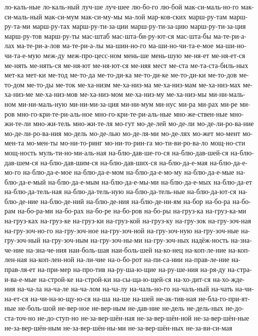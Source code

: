 {ло-каль-ные
ло-каль-ный
луч-ше
луч-шее
лю-бо-го
лю-бой
мак-си-маль-но-го
мак-си-маль-ный
мак-си-мум
мак-си-му-мы
ма-лой
мар-ков-ских
марш-ру-там
марш-ру-та-ми
марш-ру-тах
марш-ру-ти-за-ции
марш-ру-ти-за-цию
марш-ру-ти-за-ция
марш-ру-тов
марш-ру-ты
мас-штаб
мас-шта-би-ру-ют-ся
мас-шта-бы
ма-те-ри-а-лах
ма-те-ри-а-лов
ма-те-ри-а-лы
ма-шин-но-го
ма-ши-но-чи-та-е-мое
ма-ши-но-чи-та-е-мую
меж-ду
меж-про-цесс-ном
мень-ше
мень-шую
ме-ня-ет
ме-ня-ет-ся
ме-нять
ме-нять-ся
ме-ня-ют
ме-ня-ют-ся
ме-няя
мест
ме-ста
ме-та-ста-биль-ных
мет-ка
мет-ки
ме-тод
ме-то-да
ме-то-ди-ка
ме-то-ди-ке
ме-то-ди-ки
ме-то-дов
ме-то-дом
ме-то-ды
ме-ток
ме-ха-низм
ме-ха-низ-ма
ме-ха-низ-мам
ме-ха-низ-мах
ме-ха-низ-ме
ме-ха-низ-мов
ме-ха-низ-мом
ме-ха-низ-му
ме-ха-низ-мы
ми-ни-маль-ном
ми-ни-маль-ную
ми-ни-ми-за-ция
ми-ни-мум
ми-нус
ми-ра
ми-рах
ми-ре
ми-ров
мно-го-кри-те-ри-аль-ное
мно-го-кри-те-ри-аль-ные
мно-же-ствен-ные
мно-жи-те-ли
мно-жи-тель
мно-жи-те-ля
мо-гут
мо-де-лей
мо-де-ли
мо-де-ли-ро-ва-ние
мо-де-ли-ро-ва-ния
мо-дель
мо-де-лью
мо-де-ля-ми
мо-де-лях
мо-жет
мо-мент
мо-мен-та
мо-мен-ты
мо-ни-то-ринг
мо-ни-то-рин-га
мо-ти-ви-ро-ва-ло
мощ-но-сти
мощ-ность
муль-ти-но-ми-аль-ная
на-блю-дав-ше-го-ся
на-блю-дав-шей-ся
на-блю-дав-шем-ся
на-блю-дав-шим-ся
на-блю-дав-ших-ся
на-блю-да-е-мая
на-блю-да-е-мо-го
на-блю-да-е-мое
на-блю-да-е-мом
на-блю-да-е-мо-му
на-блю-да-е-мые
на-блю-да-е-мый
на-блю-да-е-мым
на-блю-да-е-мы-ми
на-блю-да-е-мых
на-блю-да-ет
на-блю-да-тель-ная
на-блю-да-тель-ную
на-блю-да-тель-ные
на-блю-да-ют-ся
на-блю-де-ние
на-блю-де-ний
на-блю-де-ния
на-блю-де-ни-ям
на-бор
на-бо-ра
на-бо-рам
на-бо-ра-ми
на-бо-рах
на-бо-ре
на-бо-ров
на-бо-ры
на-груз-ка
на-груз-ка-ми
на-груз-ках
на-груз-ке
на-груз-ки
на-груз-кой
на-груз-ку
на-гру-зок
на-гру-зоч-ная
на-гру-зоч-но-го
на-гру-зоч-ное
на-гру-зоч-ной
на-гру-зоч-ную
на-гру-зоч-ные
на-гру-зоч-ный
на-гру-зоч-ным
на-гру-зоч-ны-ми
на-гру-зоч-ных
надёж-ность
на-зна-че-ние
на-зна-че-ния
наи-боль-шая
наи-боль-шей
на-ко-нец
на-коп-ле-ние
на-коп-лен-ная
на-коп-лен-ной
на-ли-чие
на-о-бо-рот
на-пи-са-нии
на-прав-ле-ние
на-прав-ля-ет
на-при-мер
на-про-тив
на-ру-ша-ю-щие
на-ру-ше-ния
на-ря-ду
на-стра-и-ва-е-мые
на-строй-ке
на-строй-ки
на-сы-ща-ю-щей-ся
на-хо-дит-ся
на-хо-жде-ния
на-ча-ла
на-ча-ле
на-ча-лом
на-ча-лу
на-чаль-но-го
на-чаль-ный
на-чать
на-чи-на-ет-ся
на-чи-на-ю-щу-ю-ся
на-ша
на-ше
на-шей
не-ак-тив-ная
не-бла-го-при-ят-ные
не-боль-шой
не-вер-ное
не-вер-ным
не-дав-ние
не-дель
не-дель-ных
не-до-ста-точ-но
не-до-ступ-но
не-за-вер-шён-ная
не-за-вер-шён-ной
не-за-вер-шён-ные
не-за-вер-шён-ным
не-за-вер-шён-ны-ми
не-за-вер-шён-ных
не-за-ви-си-мая
}

